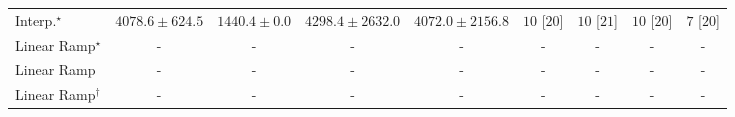 \begin{tabular}{l|cccc|cccc|}
Interp.$^\star$ & {\cellcolor[HTML]{B4C4DF}} \color[HTML]{000000} $4078.6\pm 624.5$ & {\cellcolor[HTML]{FFF7FB}} \color[HTML]{000000} $1440.4\pm 0.0$ & {\cellcolor[HTML]{A9BFDC}} \color[HTML]{000000} $4298.4\pm 2632.0$ & {\cellcolor[HTML]{B4C4DF}} \color[HTML]{000000} $4072.0\pm 2156.8$ & {\cellcolor[HTML]{49006A}} \color[HTML]{F1F1F1} $10$ [$20$] & {\cellcolor[HTML]{49006A}} \color[HTML]{F1F1F1} $10$ [$21$] & {\cellcolor[HTML]{49006A}} \color[HTML]{F1F1F1} $10$ [$20$] & {\cellcolor[HTML]{CD238F}} \color[HTML]{F1F1F1} $7$ [$20$] \\
Linear Ramp$^\star$ & {\cellcolor[HTML]{000000}} \color[HTML]{F1F1F1} {\cellcolor{white}} \color{black} - & {\cellcolor[HTML]{000000}} \color[HTML]{F1F1F1} {\cellcolor{white}} \color{black} - & {\cellcolor[HTML]{000000}} \color[HTML]{F1F1F1} {\cellcolor{white}} \color{black} - & {\cellcolor[HTML]{000000}} \color[HTML]{F1F1F1} {\cellcolor{white}} \color{black} - & {\cellcolor[HTML]{000000}} \color[HTML]{F1F1F1} {\cellcolor{white}} \color{black} - & {\cellcolor[HTML]{000000}} \color[HTML]{F1F1F1} {\cellcolor{white}} \color{black} - & {\cellcolor[HTML]{000000}} \color[HTML]{F1F1F1} {\cellcolor{white}} \color{black} - & {\cellcolor[HTML]{000000}} \color[HTML]{F1F1F1} {\cellcolor{white}} \color{black} - \\
Linear Ramp & {\cellcolor[HTML]{000000}} \color[HTML]{F1F1F1} {\cellcolor{white}} \color{black} - & {\cellcolor[HTML]{000000}} \color[HTML]{F1F1F1} {\cellcolor{white}} \color{black} - & {\cellcolor[HTML]{000000}} \color[HTML]{F1F1F1} {\cellcolor{white}} \color{black} - & {\cellcolor[HTML]{000000}} \color[HTML]{F1F1F1} {\cellcolor{white}} \color{black} - & {\cellcolor[HTML]{000000}} \color[HTML]{F1F1F1} {\cellcolor{white}} \color{black} - & {\cellcolor[HTML]{000000}} \color[HTML]{F1F1F1} {\cellcolor{white}} \color{black} - & {\cellcolor[HTML]{000000}} \color[HTML]{F1F1F1} {\cellcolor{white}} \color{black} - & {\cellcolor[HTML]{000000}} \color[HTML]{F1F1F1} {\cellcolor{white}} \color{black} - \\
Linear Ramp$^\dagger$ & {\cellcolor[HTML]{000000}} \color[HTML]{F1F1F1} {\cellcolor{white}} \color{black} - & {\cellcolor[HTML]{000000}} \color[HTML]{F1F1F1} {\cellcolor{white}} \color{black} - & {\cellcolor[HTML]{000000}} \color[HTML]{F1F1F1} {\cellcolor{white}} \color{black} - & {\cellcolor[HTML]{000000}} \color[HTML]{F1F1F1} {\cellcolor{white}} \color{black} - & {\cellcolor[HTML]{000000}} \color[HTML]{F1F1F1} {\cellcolor{white}} \color{black} - & {\cellcolor[HTML]{000000}} \color[HTML]{F1F1F1} {\cellcolor{white}} \color{black} - & {\cellcolor[HTML]{000000}} \color[HTML]{F1F1F1} {\cellcolor{white}} \color{black} - & {\cellcolor[HTML]{000000}} \color[HTML]{F1F1F1} {\cellcolor{white}} \color{black} - \\

\end{tabular}
